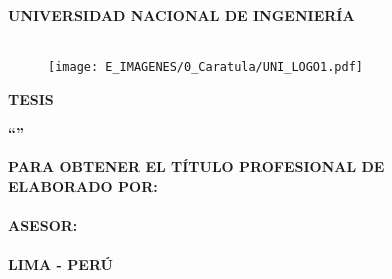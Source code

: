 \begin{titlepage}
	
	\begin{center}
		\vspace*{2 mm}
		{\LARGE \textbf{UNIVERSIDAD NACIONAL DE INGENIERÍA}}\\
		\vspace{5 mm}
		{\LARGE \textbf{\@facultad}}\\
		\vspace{6.5 mm}
		\begin{figure}[h]
			\centering 
			\texttt{[image: E\_IMAGENES/0\_Caratula/UNI\_LOGO1.pdf]}
		\end{figure}
		\vspace{1 mm}	
		{\Large \textbf{TESIS} }\\
		\vspace{5 mm}
		
		\onehalfspacing  %
		{\Large \textbf{``{\@titlecaratula}''} }\\
		
		\singlespacing  %
		
		\vspace{5 mm}	
		{\large \textbf{PARA OBTENER EL TÍTULO PROFESIONAL DE {\@grado} } }\\
		\vspace{10 mm}
		{\large \textbf{ELABORADO POR:} }\\
		\vspace{5 mm}	
		{\large \textbf{\@authorcaratula} }\\
		\vspace{10 mm}
		{\large \textbf{ASESOR:} }\\
		\vspace{5 mm}	
		{\large \textbf{\@asesor} }\\
		\vspace{10 mm}	
		{\large \textbf{LIMA - PERÚ} }\\
		\vspace{5 mm}	
		{\large \textbf{\@yyearr} }\\

	\end{center}

\end{titlepage}